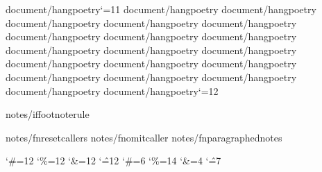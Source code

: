 {document/hangpoetry}\catcode`\@=11
{document/hangpoetry}
{document/hangpoetry}
{document/hangpoetry}
{document/hangpoetry}
{document/hangpoetry}
{document/hangpoetry}
{document/hangpoetry}
{document/hangpoetry}
{document/hangpoetry}
{document/hangpoetry}
{document/hangpoetry}
{document/hangpoetry}
{document/hangpoetry}
{document/hangpoetry}
{document/hangpoetry}
{document/hangpoetry}
{document/hangpoetry}
{document/hangpoetry}
{document/hangpoetry}\catcode`\@=12


{notes/iffootnoterule}\def\footnoterule{{}} 

{notes/fnresetcallers}
{notes/fnomitcaller}
{notes/fnparagraphednotes}

\catcode`\#=12 \catcode`\%=12 \catcode`\&=12 \catcode`\^=12
\catcode`\#=6 \catcode`\%=14 \catcode`\&=4 \catcode`\^=7
%


